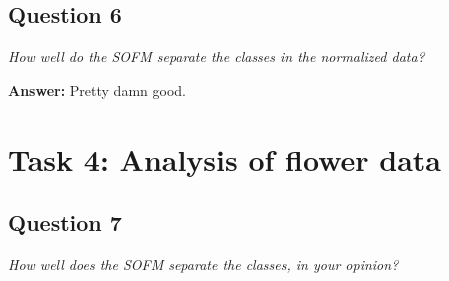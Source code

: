 \documentclass[a4paper]{article}
\begin{document}
\subsection*{Question 6}
\emph{How well do the SOFM separate the classes in the normalized
data?}

\textbf{Answer:} 
Pretty damn good.

\section*{Task 4: Analysis of flower data}

\subsection*{Question 7}
\emph{How well does the SOFM separate the classes, in your opinion?}
\end{document}
